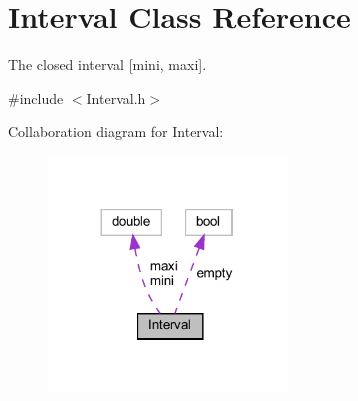 \hypertarget{classInterval}{}\section{Interval Class Reference}
\label{classInterval}


The closed interval \mbox{[}mini, maxi\mbox{]}.  




{\ttfamily \#include $<$Interval.\+h$>$}



Collaboration diagram for Interval\+:
\nopagebreak
\begin{figure}[H]
\begin{center}
\leavevmode
\includegraphics[width=180pt]{classInterval__coll__graph}
\end{center}
\end{figure}

